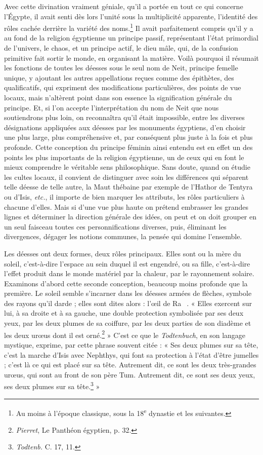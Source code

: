 \documentclass[letterpaper,twocolumn,openany,nodeprecatedcode]{dndbook}
\newcommand*\hieroAADB{}
\newcommand*\hieroAAOK{}
\newcommand*\hieroAAXA{}
\begin{document}
Avec cette divination vraiment géniale, qu'il a portée en tout ce qui concerne l'Égypte, il avait senti dès lors l'unité sous la multiplicité apparente, l'identité des rôles cachée derrière la variété des noms.\footnote{Au moins à l'époque classique, sous la 18\textsuperscript{e} dynastie et les suivantes.} Il avait parfaitement compris qu'il y a au fond de la religion égyptienne un principe passif, représentant l'état primordial de l'univers, le chaos, et un principe actif, le dieu mâle, qui, de la confusion primitive fait sortir le monde, en organisant la matière. Voilà pourquoi il résumait les fonctions de toutes les déesses sous le seul nom de Neit, principe femelle unique, y ajoutant les autres appellations reçues comme des épithètes, des qualificatifs, qui expriment des modifications particulières, des points de vue locaux, mais n'altèrent point dans son essence la signification générale du principe. Et, si l'on accepte l'interprétation du nom de Neit que nous soutiendrons plus loin, on reconnaîtra qu'il était impossible, entre les diverses désignations appliquées aux déesses par les monuments égyptiens, d'en choisir une plus large, plus compréhensive et, par conséquent plus juste à la fois et plus profonde. Cette conception du principe féminin ainsi entendu est en effet un des points les plus importants de la religion égyptienne, un de ceux qui en font le mieux comprendre le véritable sens philosophique. Sans doute, quand on étudie les cultes locaux, il convient de distinguer avec soin les différences qui séparent telle déesse de telle autre, la Maut thébaine par exemple de l'Hathor de Tentyra ou d'Isis, \emph{etc.}, il importe de bien marquer les attributs, les rôles particuliers à chacune d'elles. Mais si d'une vue plus haute on prétend embrasser les grandes lignes et déterminer la direction générale des idées, on peut et on doit grouper en un seul faisceau toutes ces personnifications diverses, puis, éliminant les divergences, dégager les notions communes, la pensée qui domine l'ensemble.

Les déesses ont deux formes, deux rôles principaux. Elles sont ou la mère du soleil, c'est-à-dire l'espace au sein duquel il est engendré, ou sa fille, c'est-à-dire l'effet produit dans le monde matériel par la chaleur, par le rayonnement solaire. Examinons d'abord cette seconde conception, beaucoup moins profonde que la première. Le soleil semble s'incarner dans les déesses armées de flèches, symbole des rayons qu'il darde ; elles sont dites alors : l'œil de Ra $\hieroAAXA\:\hieroAAOK\:\hieroAADB$. « Elles exercent sur lui, à sa droite et à sa gauche, une double protection symbolisée par ses deux yeux, par les deux plumes de sa coiffure, par les deux parties de son diadème et les deux urœus dont il est orné.\footnote{\emph{Pierret}, Le Panthéon égyptien, p. 32.} » C'est ce que le \emph{Todtenbuch}, en son langage mystique, exprime, par cette phrase souvent citée : « Ses deux plumes sur sa tête, c'est la marche d'Isis avec Nephthys, qui font sa protection à l'état d'être jumelles ; c'est là ce qui est placé sur sa tête. Autrement dit, ce sont les deux très-grandes urœus, qui sont au front de son père Tum. Autrement dit, ce sont ses deux yeux, ses deux plumes sur sa tête.\footnote{\emph{Todtenb.} C. 17, 11.} »
\end{document}
